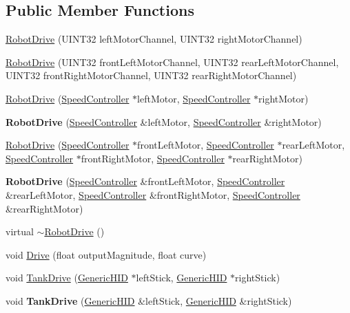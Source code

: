\subsection*{\-Public \-Member \-Functions}
\begin{DoxyCompactItemize}
\item 
\hyperlink{classRobotDrive_a9cf81a481115792788aec8cb3e91b31c}{\-Robot\-Drive} (\-U\-I\-N\-T32 left\-Motor\-Channel, \-U\-I\-N\-T32 right\-Motor\-Channel)
\item 
\hyperlink{classRobotDrive_ae0892e46b7a378e546b5499ce686bef8}{\-Robot\-Drive} (\-U\-I\-N\-T32 front\-Left\-Motor\-Channel, \-U\-I\-N\-T32 rear\-Left\-Motor\-Channel, \-U\-I\-N\-T32 front\-Right\-Motor\-Channel, \-U\-I\-N\-T32 rear\-Right\-Motor\-Channel)
\item 
\hyperlink{classRobotDrive_a8acf6e6ab76d4442c9e58094147c1bd9}{\-Robot\-Drive} (\hyperlink{classSpeedController}{\-Speed\-Controller} $\ast$left\-Motor, \hyperlink{classSpeedController}{\-Speed\-Controller} $\ast$right\-Motor)
\item 
\hypertarget{classRobotDrive_a558340487b3deaf4ba919dd0b888de3c}{{\bfseries \-Robot\-Drive} (\hyperlink{classSpeedController}{\-Speed\-Controller} \&left\-Motor, \hyperlink{classSpeedController}{\-Speed\-Controller} \&right\-Motor)}\label{classRobotDrive_a558340487b3deaf4ba919dd0b888de3c}

\item 
\hyperlink{classRobotDrive_a47180c144fcca9e7550f7cb906c8b79a}{\-Robot\-Drive} (\hyperlink{classSpeedController}{\-Speed\-Controller} $\ast$front\-Left\-Motor, \hyperlink{classSpeedController}{\-Speed\-Controller} $\ast$rear\-Left\-Motor, \hyperlink{classSpeedController}{\-Speed\-Controller} $\ast$front\-Right\-Motor, \hyperlink{classSpeedController}{\-Speed\-Controller} $\ast$rear\-Right\-Motor)
\item 
\hypertarget{classRobotDrive_a98d8c91f1e9d960c9b7396638927d4b1}{{\bfseries \-Robot\-Drive} (\hyperlink{classSpeedController}{\-Speed\-Controller} \&front\-Left\-Motor, \hyperlink{classSpeedController}{\-Speed\-Controller} \&rear\-Left\-Motor, \hyperlink{classSpeedController}{\-Speed\-Controller} \&front\-Right\-Motor, \hyperlink{classSpeedController}{\-Speed\-Controller} \&rear\-Right\-Motor)}\label{classRobotDrive_a98d8c91f1e9d960c9b7396638927d4b1}

\item 
virtual \hyperlink{classRobotDrive_afb1b0e87856dca22c13a4baed8ab6059}{$\sim$\-Robot\-Drive} ()
\item 
void \hyperlink{classRobotDrive_a00f3c6f7906685fe2f98ceaa8bb7e188}{\-Drive} (float output\-Magnitude, float curve)
\item 
void \hyperlink{classRobotDrive_a47df0f6d6a60ab9fe99cf5e953f06d76}{\-Tank\-Drive} (\hyperlink{classGenericHID}{\-Generic\-H\-I\-D} $\ast$left\-Stick, \hyperlink{classGenericHID}{\-Generic\-H\-I\-D} $\ast$right\-Stick)
\item 
\hypertarget{classRobotDrive_ac8b4d83072ebb285a2682cf73f52e6b2}{void {\bfseries \-Tank\-Drive} (\hyperlink{classGenericHID}{\-Generic\-H\-I\-D} \&left\-Stick, \hyperlink{classGenericHID}{\-Generic\-H\-I\-D} \&right\-Stick)}\label{classRobotDrive_ac8b4d83072ebb285a2682cf73f52e6b2}


\end{DoxyCompactItemize}
